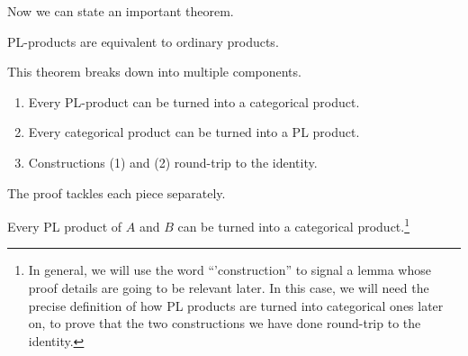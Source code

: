 Now we can state an important theorem.
\begin{theorem}
  PL-products are equivalent to ordinary products.
\end{theorem}
This theorem breaks down into multiple components.
\begin{enumerate}
\item Every PL-product can be turned into a categorical product.
\item Every categorical product can be turned into a PL product.
\item Constructions (1) and (2) round-trip to the identity.
\end{enumerate}
The proof tackles each piece separately.
\begin{construction} \label{cons:pl-prod-to-prod}
Every PL product of $A$ and $B$
can be turned into a categorical product.\footnote{In general, we will use the word ``'construction'' to signal a lemma whose proof details are going to be relevant later. In this case, we will need the precise definition of how PL products are turned into categorical ones later on, to prove that the two constructions we have done round-trip to the identity.}
\end{construction}
